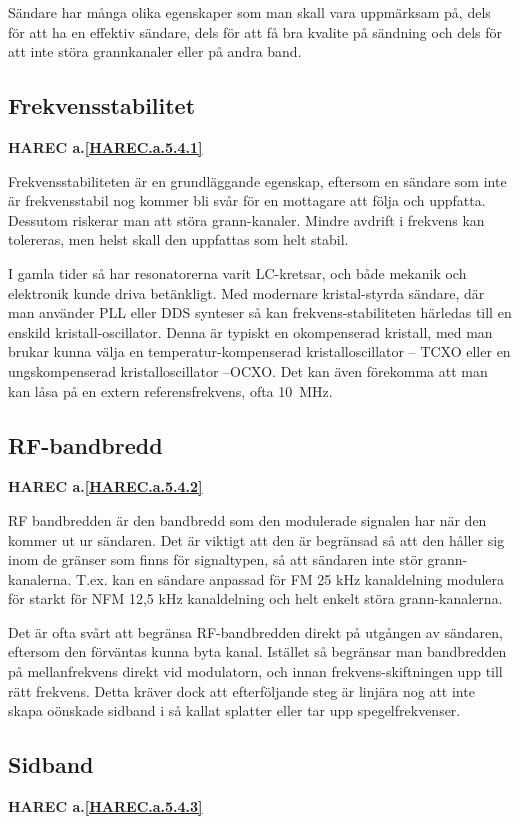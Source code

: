 Sändare har många olika egenskaper som man skall vara uppmärksam på, dels för
att ha en effektiv sändare, dels för att få bra kvalite på sändning och dels
för att inte störa grannkanaler eller på andra band.

\subsection{Frekvensstabilitet}
\textbf{HAREC
  a.\ref{HAREC.a.5.4.1}\label{myHAREC.a.5.4.1}
}

Frekvensstabiliteten är en grundläggande egenskap, eftersom en sändare som
inte är frekvensstabil nog kommer bli svår för en mottagare att följa och
uppfatta. Dessutom riskerar man att störa grann-kanaler. Mindre avdrift i
frekvens kan tolereras, men helst skall den uppfattas som helt stabil.

I gamla tider så har resonatorerna varit LC-kretsar, och både mekanik och
elektronik kunde driva betänkligt. Med modernare kristal-styrda sändare, där
man använder PLL eller DDS synteser så kan frekvens-stabiliteten härledas
till en enskild kristall-oscillator. Denna är typiskt en okompenserad kristall,
med man brukar kunna välja en temperatur-kompenserad kristalloscillator -- TCXO
eller en ungskompenserad kristalloscillator --OCXO. Det kan även förekomma att
man kan låsa på en extern referensfrekvens, ofta 10~MHz.

\subsection{RF-bandbredd}
\textbf{HAREC
  a.\ref{HAREC.a.5.4.2}\label{myHAREC.a.5.4.2}
}

RF bandbredden är den bandbredd som den modulerade signalen har när den kommer
ut ur sändaren. Det är viktigt att den är begränsad så att den håller sig inom
de gränser som finns för signaltypen, så att sändaren inte stör grann-kanalerna.
T.ex. kan en sändare anpassad för FM 25 kHz kanaldelning modulera för starkt för
NFM 12,5 kHz kanaldelning och helt enkelt störa grann-kanalerna.

Det är ofta svårt att begränsa RF-bandbredden direkt på utgången av sändaren,
eftersom den förväntas kunna byta kanal. Istället så begränsar man bandbredden
på mellanfrekvens direkt vid modulatorn, och innan frekvens-skiftningen upp
till rätt frekvens. Detta kräver dock att efterföljande steg är linjära nog att
inte skapa oönskade sidband i så kallat splatter eller tar upp spegelfrekvenser.

\subsection{Sidband}
\textbf{HAREC
  a.\ref{HAREC.a.5.4.3}\label{myHAREC.a.5.4.3}
}

